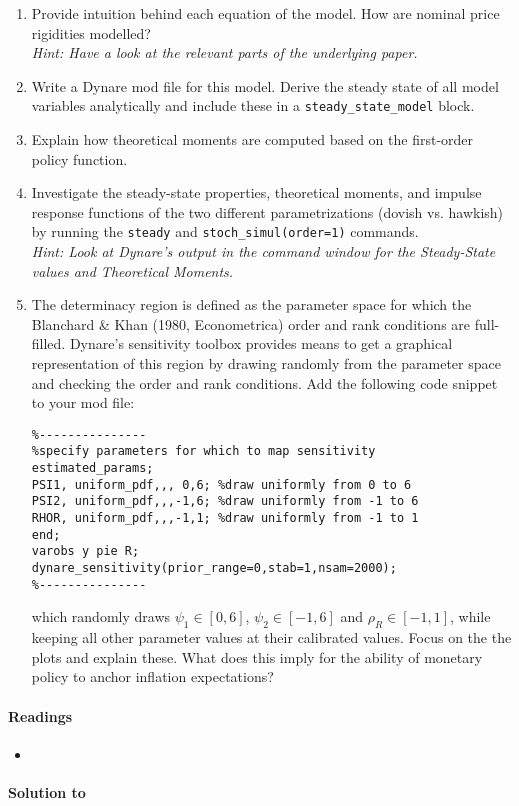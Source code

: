 \begin{enumerate}

\item Provide intuition behind each equation of the model.
How are nominal price rigidities modelled?\\\emph{Hint: Have a look at the relevant parts of the underlying paper.}

\item Write a Dynare mod file for this model. Derive the steady state of all model variables analytically and include these in a \texttt{steady\_state\_model} block.

\item Explain how theoretical moments are computed based on the first-order policy function.

\item Investigate the steady-state properties, theoretical moments, and impulse response functions of the two different parametrizations (dovish vs. hawkish) 
  by running the \texttt{steady} and \texttt{stoch\_simul(order=1)} commands.
\\
\emph{Hint: Look at Dynare's output in the command window for the Steady-State values and Theoretical Moments.}
\item The determinacy region is defined as the parameter space for which the Blanchard \& Khan (1980, Econometrica) order and rank conditions are full-filled.
Dynare's sensitivity toolbox provides means to get a graphical representation of this region
  by drawing randomly from the parameter space and checking the order and rank conditions.
Add the following code snippet to your mod file:
\begin{verbatim}
%---------------
%specify parameters for which to map sensitivity
estimated_params;
PSI1, uniform_pdf,,, 0,6; %draw uniformly from 0 to 6
PSI2, uniform_pdf,,,-1,6; %draw uniformly from -1 to 6
RHOR, uniform_pdf,,,-1,1; %draw uniformly from -1 to 1
end;
varobs y pie R;
dynare_sensitivity(prior_range=0,stab=1,nsam=2000);		
%---------------
\end{verbatim}	
  which randomly draws $\psi_1 \in [0,6]$, $\psi_2 \in [-1,6]$ and $\rho_R \in [-1,1]$,
  while keeping all other parameter values at their calibrated values.
Focus on the the plots and explain these.
What does this imply for the ability of monetary policy to anchor inflation expectations?
\end{enumerate}

\paragraph{Readings}
\begin{itemize}
	\item \textcite{An.Schorfheide_2007_BayesianAnalysisDSGE}
\end{itemize}

\begin{solution}\textbf{Solution to }
\ifDisplaySolutions

\fi
\newpage
\end{solution}